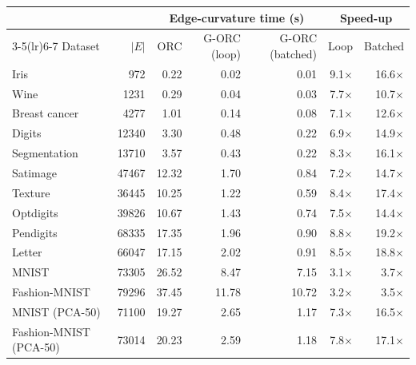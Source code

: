 \begin{tabular}{@{}lrrrrrr@{}}
\toprule
 & & \multicolumn{3}{c}{Edge-curvature time (s)} & \multicolumn{2}{c}{Speed-up} \\
\cmidrule(lr){3-5}\cmidrule(lr){6-7}
Dataset & $|E|$ & ORC & G-ORC (loop) & G-ORC (batched) & Loop & Batched \\
\midrule
Iris & 972 & 0.22 & 0.02 & 0.01 & 9.1$\times$ & 16.6$\times$ \\
Wine & 1231 & 0.29 & 0.04 & 0.03 & 7.7$\times$ & 10.7$\times$ \\
Breast cancer & 4277 & 1.01 & 0.14 & 0.08 & 7.1$\times$ & 12.6$\times$ \\
Digits & 12340 & 3.30 & 0.48 & 0.22 & 6.9$\times$ & 14.9$\times$ \\
Segmentation & 13710 & 3.57 & 0.43 & 0.22 & 8.3$\times$ & 16.1$\times$ \\
Satimage & 47467 & 12.32 & 1.70 & 0.84 & 7.2$\times$ & 14.7$\times$ \\
Texture & 36445 & 10.25 & 1.22 & 0.59 & 8.4$\times$ & 17.4$\times$ \\
Optdigits & 39826 & 10.67 & 1.43 & 0.74 & 7.5$\times$ & 14.4$\times$ \\
Pendigits & 68335 & 17.35 & 1.96 & 0.90 & 8.8$\times$ & 19.2$\times$ \\
Letter & 66047 & 17.15 & 2.02 & 0.91 & 8.5$\times$ & 18.8$\times$ \\
MNIST & 73305 & 26.52 & 8.47 & 7.15 & 3.1$\times$ & 3.7$\times$ \\
Fashion-MNIST & 79296 & 37.45 & 11.78 & 10.72 & 3.2$\times$ & 3.5$\times$ \\
MNIST (PCA-50) & 71100 & 19.27 & 2.65 & 1.17 & 7.3$\times$ & 16.5$\times$ \\
Fashion-MNIST (PCA-50) & 73014 & 20.23 & 2.59 & 1.18 & 7.8$\times$ & 17.1$\times$ \\
\bottomrule
\end{tabular}
